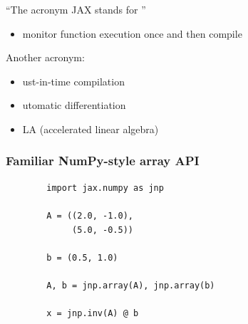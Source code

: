 \begin{frame}

    ``The acronym JAX stands for ''

    \begin{itemize}
        \item monitor function execution once and then compile
    \end{itemize} 

            \vspace{0.5em}
            \vspace{0.5em}
            \vspace{0.5em}

    Another acronym:

    \begin{itemize}
        \item {}ust-in-time compilation
            \vspace{0.5em}
        \item {}utomatic differentiation
            \vspace{0.5em}
        \item {}LA (accelerated linear algebra)
    \end{itemize}



\end{frame}

\begin{frame}[fragile]
    \frametitle{Familiar NumPy-style array API}

    \begin{verbatim}
        import jax.numpy as jnp

        A = ((2.0, -1.0),
             (5.0, -0.5))

        b = (0.5, 1.0)

        A, b = jnp.array(A), jnp.array(b)

        x = jnp.inv(A) @ b
    \end{verbatim}

\end{frame}



